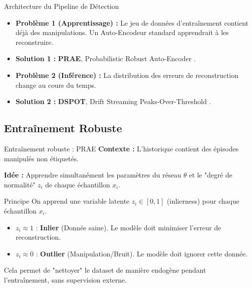 \documentclass{beamer}
\begin{document}
\begin{frame}{Architecture du Pipeline de Détection}
\begin{tikzpicture}
    \end{tikzpicture}

    \begin{itemize}
        \item \textbf{Problème 1 (Apprentissage) :} Le jeu de données d'entraînement contient déjà des manipulations. Un Auto-Encodeur standard apprendrait à les reconstruire.
        \item \textbf{Solution 1 :} \textbf{PRAE}, Probabilistic Robust Auto-Encoder \cite{lindenbaum2022prae}.
        
        \vspace{0.1cm}
        \item \textbf{Problème 2 (Inférence) :} La distribution des erreurs de reconstruction change au cours du temps.
        \item \textbf{Solution 2 :} \textbf{DSPOT}, Drift Streaming Peaks-Over-Threshold \cite{siffer:hal-01640325}.
    \end{itemize}
\end{frame}

\subsection{Entraînement Robuste}
\begin{frame}{Entraînement robuste : PRAE}
    \textbf{Contexte :} L'historique contient des épisodes manipulés non étiquetés.

    \textbf{Idée :} Apprendre simultanément les paramètres du réseau $\theta$ et le "degré de normalité" $z_i$ de chaque échantillon $x_i$.

    \vspace{0.1cm}
    \begin{block}{Principe \cite{lindenbaum2022prae}}
        On apprend une variable latente $z_i \in [0,1]$ (inlierness) pour chaque échantillon $x_i$.
        \begin{itemize}
            \item $z_i \approx 1$ : \textbf{Inlier} (Donnée saine). Le modèle doit minimiser l'erreur de reconstruction.
            \item $z_i \approx 0$ : \textbf{Outlier} (Manipulation/Bruit). Le modèle doit ignorer cette donnée.
        \end{itemize}
    \end{block}

    Cela permet de "nettoyer" le dataset de manière endogène pendant l'entraînement, sans supervision externe.
\end{frame}
\end{document}
